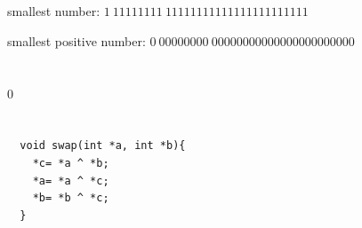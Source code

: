 \documentclass[UTF8]{ctexart}
\begin{document}
\section{}
smallest number: $1\ 11111111\ 11111111111111111111111$

smallest positive number: $0\ 00000000\ 00000000000000000000000$
\section{}
0 
\section{}
\subsection{}
\begin{lstlisting}
  void swap(int *a, int *b){
    *c= *a ^ *b;
    *a= *a ^ *c;
    *b= *b ^ *c;
  }
\end{lstlisting}
\subsection{}
\clearpage
\end{document}
